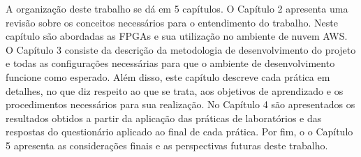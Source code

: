A organização deste trabalho se dá em 5 capítulos. O Capítulo 2 apresenta uma revisão sobre os conceitos necessários para o entendimento do trabalho. Neste capítulo são abordadas as FPGAs e sua utilização no ambiente de nuvem AWS. O Capítulo 3 consiste da descrição da metodologia de desenvolvimento do projeto e todas as configurações necessárias para que o ambiente de desenvolvimento funcione como esperado. Além disso, este capítulo descreve cada prática em detalhes, no que diz respeito ao que se trata, aos objetivos de aprendizado e os procedimentos necessários para sua realização. No Capítulo 4 são apresentados os resultados obtidos a partir da aplicação das práticas de laboratórios e das respostas do questionário aplicado ao final de cada prática. Por fim, o o Capítulo 5 apresenta as considerações finais e as perspectivas futuras deste trabalho.





	

	
